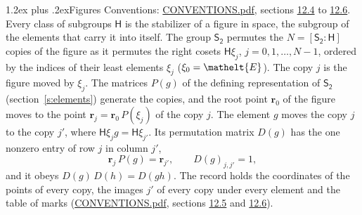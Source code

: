 \documentclass[10pt,a4paper]{article}
\makeatletter
\renewcommand\section{\@startsection{section}{1}{\z@}{-3ex plus -1ex minus -.2ex}%
  {1.2ex plus .2ex}{\normalfont\large\sffamily\bfseries\color{parttitle}}}
\numberwithin{equation}{section}
\newcommand{\eltfont}[1]{{\let\sigma\eltsigma\mathelt{#1}}}
\newcommand{\grp}[1]{\mathsf{#1}}
\newcommand{\cls}[1]{\eltfont{#1}}
\newcommand{\pointr}{\mathbf{r}}
\makeatother
\begin{document}
\section{Figures}\label{s:permutation}
Conventions: \href{../../CONVENTIONS.pdf}{CONVENTIONS.pdf}, sections \href{../../CONVENTIONS.pdf\#conv.12.4}{12.4} to \href{../../CONVENTIONS.pdf\#conv.12.6}{12.6}.
Every class of subgroups $\grp{H}$ is the stabilizer of a figure in space, the subgroup of the elements that carry it into itself. \label{n:local.orbit.size}\label{n:element.coset.least}\label{n:index.coset}The group $\grp{S_{2}}$ permutes the $N = [\grp{S_{2}} : \grp{H}]$ copies of the figure as it permutes the right cosets $\grp{H}\xi_j$, $j = 0, 1, \dots, N - 1$, ordered by the indices of their least elements $\xi_j$ ($\xi_0 = \cls{E}$). The copy $j$ is the figure moved by $\xi_j$. The matrices $P(g)$ of the defining representation of $\grp{S_{2}}$ (section~\ref{s:elements}) generate the copies, and the root point $\pointr_0$ of the figure moves to the point $\pointr_j = \pointr_0\, P(\xi_j)$ of the copy $j$. \label{n:local.coset.image}The element $g$ moves the copy $j$ to the copy $j'$, where $\grp{H}\xi_j g = \grp{H}\xi_{j'}$. \label{n:local.matrix.permutation}Its permutation matrix $D(g)$ has the one nonzero entry of row $j$ in column $j'$,
\begin{equation}\label{e:perm.matrix}\pointr_j\, P(g) = \pointr_{j'}, \qquad D(g)_{j,j'} = 1,\end{equation}
and it obeys $D(g)\, D(h) = D(gh)$. The record holds the coordinates of the points of every copy, the images $j'$ of every copy under every element and the table of marks (\href{../../CONVENTIONS.pdf}{CONVENTIONS.pdf}, sections \href{../../CONVENTIONS.pdf\#conv.12.5}{12.5} and \href{../../CONVENTIONS.pdf\#conv.12.6}{12.6}).
\end{document}
